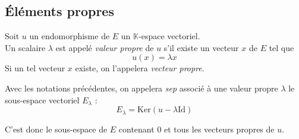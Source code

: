 \documentclass[11pt,a4paper,fleqn,pdftex]{report}
\begin{document}
\subsection{Éléments propres}
\begin{dfn}
     Soit $u$ un endomorphisme de $E$ un $\mathbb{K}$-espace vectoriel.\\ 
     Un scalaire $\lambda$ est appelé \emph{valeur propre} de $u$ s'il existe un vecteur $x$  de $E$ tel que 
     \begin{equation}
     u(x) = \lambda x
     \end{equation}
     Si un tel vecteur $x$ existe, on l'appelera \emph{vecteur propre}.
\end{dfn}
\begin{dfn}
\label{dfn:sous-espace_propre}
     Avec les notations précédentes, on appelera \emph{\acrfull{sep}} associé à une valeur propre $\lambda$ le sous-espace vectoriel $E_\lambda$ : 
     \begin{equation}
     E_\lambda = \mathrm{Ker} \left( u - \lambda \mathrm{Id} \right) 
     \end{equation}

     C'est donc le sous-espace de $E$ contenant $0$ et tous les vecteurs propres de $u$.
\end{dfn}
\end{document}
